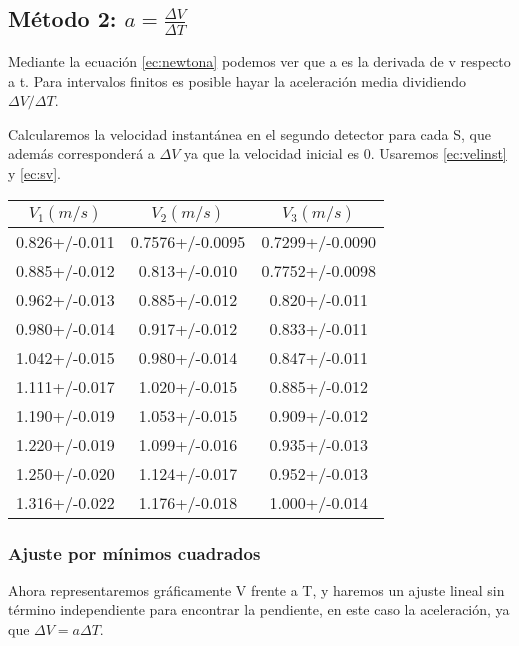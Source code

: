 \documentclass[12pt, a4paper, titlepage]{article}
\begin{document}
  \newpage
  \subsection{Método 2: $a = \frac{\Delta V}{\Delta T}$}

  Mediante la ecuación \ref{ec:newtona} podemos ver que a es la derivada de v respecto a t. Para intervalos finitos es posible hayar la aceleración media dividiendo $\Delta V / \Delta T$.

  Calcularemos la velocidad instantánea en el segundo detector para cada S, que además corresponderá a $\Delta V$ ya que la velocidad inicial es 0. Usaremos \ref{ec:velinst} y \ref{ec:sv}.

  \begin{table}[H]
    \centering
    \begin{tabular}{|c|c|c|}\hline
    $V_1(m/s)$    & $V_2(m/s)$      & $V_3(m/s)$      \\ \hline
    0.826+/-0.011 & 0.7576+/-0.0095 & 0.7299+/-0.0090 \\
    0.885+/-0.012 & 0.813+/-0.010   & 0.7752+/-0.0098 \\
    0.962+/-0.013 & 0.885+/-0.012   & 0.820+/-0.011   \\
    0.980+/-0.014 & 0.917+/-0.012   & 0.833+/-0.011   \\
    1.042+/-0.015 & 0.980+/-0.014   & 0.847+/-0.011   \\
    1.111+/-0.017 & 1.020+/-0.015   & 0.885+/-0.012   \\
    1.190+/-0.019 & 1.053+/-0.015   & 0.909+/-0.012   \\
    1.220+/-0.019 & 1.099+/-0.016   & 0.935+/-0.013   \\
    1.250+/-0.020 & 1.124+/-0.017   & 0.952+/-0.013   \\
    1.316+/-0.022 & 1.176+/-0.018   & 1.000+/-0.014   \\ \hline
    \end{tabular}
  \end{table}

  \newpage
  \subsubsection{Ajuste por mínimos cuadrados}

  Ahora representaremos gráficamente V frente a T, y haremos un ajuste lineal sin término independiente para encontrar la pendiente, en este caso la aceleración, ya que $\Delta V = a \Delta T$.
\end{document}
